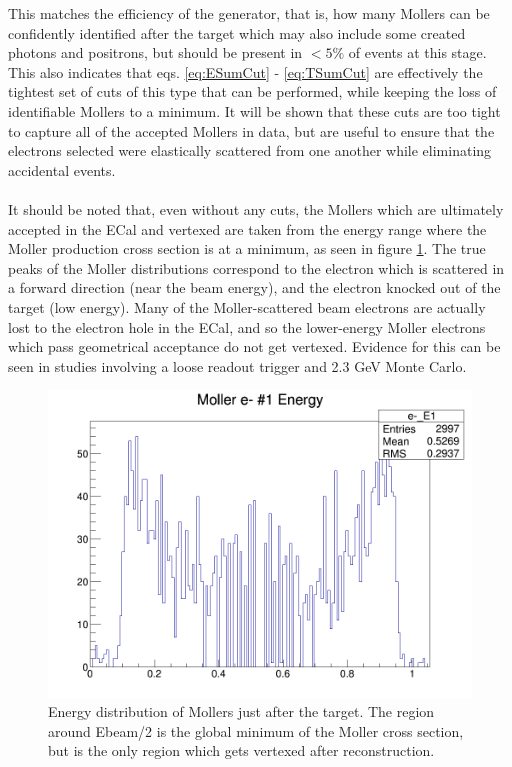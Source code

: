 \documentclass{article}
\begin{document}
	This matches the efficiency of the generator, that is, how many Mollers can be confidently identified after the target which may also include some created photons and positrons, but should be present in $<5\%$ of events at this stage. This also indicates that eqs. \ref{eq:ESumCut} - \ref{eq:TSumCut} are effectively the tightest set of cuts of this type that can be performed, while keeping the loss of identifiable Mollers to a minimum. It will be shown that these cuts are too tight to capture all of the accepted Mollers in data, but are useful to ensure that the electrons selected were elastically scattered from one another while eliminating accidental events.

\paragraph{}
It should be noted that, even without any cuts, the Mollers which are ultimately accepted in the ECal and vertexed are taken from the energy range where the Moller production cross section is at a minimum, as seen in figure  \ref{fig:stdE}. The true peaks of the Moller distributions correspond to the electron which is scattered in a forward direction (near the beam energy), and the electron knocked out of the target (low energy). Many of the Moller-scattered beam electrons are actually lost to the electron hole in the ECal, and so the lower-energy Moller electrons which pass geometrical acceptance do not get vertexed. Evidence for this can be seen in studies involving a loose readout trigger and 2.3 GeV Monte Carlo.

	\begin{figure}[H]
  	\includegraphics[width=\linewidth]{preSLICmollers/molv1_1700_e-_E1.png}
  	\caption{Energy distribution of Mollers just after the target. The region around Ebeam/2 is the global minimum of the Moller cross section, but is the only region which gets vertexed after reconstruction.}
  	\label{fig:stdE}
	\end{figure}
\end{document}
